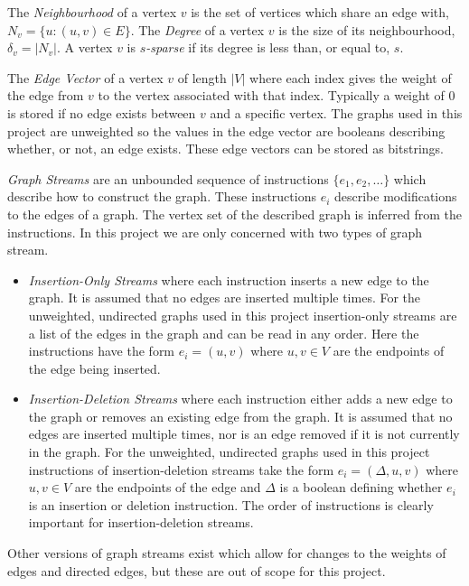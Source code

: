 \documentclass[11pt,twoside,a4paper]{report}
\begin{document}
\par The \textit{Neighbourhood} of a vertex $v$ is the set of vertices which share an edge with, $N_v=\{u:(u,v)\in E\}$. The \textit{Degree} of a vertex $v$ is the size of its neighbourhood, $\delta_v=|N_v|$. A vertex $v$ is \textit{$s$-sparse} if its degree is less than, or equal to, $s$.
\par The \textit{Edge Vector} of a vertex $v$ of length $|V|$ where each index gives the weight of the edge from $v$ to the vertex associated with that index. Typically a weight of 0 is stored if no edge exists between $v$ and a specific vertex. The graphs used in this project are unweighted so the values in the edge vector are booleans describing whether, or not, an edge exists. These edge vectors can be stored as bitstrings.
\par \textit{Graph Streams} are an unbounded sequence of instructions $\{e_1,e_2,\dots\}$ which describe how to construct the graph. These instructions $e_i$ describe modifications to the edges of a graph. The vertex set of the described graph is inferred from the instructions. In this project we are only concerned with two types of graph stream. %
\begin{itemize}
	\item \textit{Insertion-Only Streams} where each instruction inserts a new edge to the graph. It is assumed that no edges are inserted multiple times. For the unweighted, undirected graphs used in this project insertion-only streams are a list of the edges in the graph and can be read in any order. Here the instructions have the form $e_i=(u,v)$ where $u,v\in V$ are the endpoints of the edge being inserted.
	\item \textit{Insertion-Deletion Streams} where each instruction either adds a new edge to the graph or removes an existing edge from the graph. It is assumed that no edges are inserted multiple times, nor is an edge removed if it is not currently in the graph. For the unweighted, undirected graphs used in this project instructions of insertion-deletion streams take the form $e_i=(\Delta,u,v)$ where $u,v\in V$ are the endpoints of the edge and $\Delta$ is a boolean defining whether $e_i$ is an insertion or deletion instruction. The order of instructions is clearly important for insertion-deletion streams.
\end{itemize}
Other versions of graph streams exist which allow for changes to the weights of edges and directed edges, but these are out of scope for this project.
\end{document}
